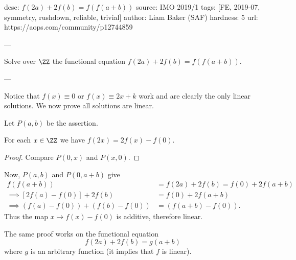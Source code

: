 desc: $f(2a) + 2f(b) = f(f(a+b))$
source: IMO 2019/1
tags: [FE, 2019-07, symmetry, rushdown, reliable, trivial]
author: Liam Baker (SAF)
hardness: 5
url: https://aops.com/community/p12744859

---

Solve over $\ZZ$ the functional equation
$f(2a) + 2f(b) = f(f(a+b))$.

---

Notice that $f(x) \equiv 0$ or $f(x) \equiv 2x+k$ work
and are clearly the only linear solutions.
We now prove all solutions are linear.

Let $P(a,b)$ be the assertion.
\begin{claim*}
  For each $x \in \ZZ$ we have $f(2x) = 2f(x) - f(0)$.
\end{claim*}
\begin{proof}
  Compare $P(0,x)$ and $P(x,0)$.
\end{proof}
Now, $P(a,b)$ and $P(0,a+b)$ give
\begin{align*}
  f(f(a+b)) &= f(2a) + 2f(b) = f(0) + 2f(a+b) \\
  \implies [2f(a) - f(0)] + 2f(b) &= f(0) + 2f(a+b) \\
  \implies \left( f(a)-f(0) \right) + \left( f(b)-f(0) \right)
  &= \left( f(a+b)-f(0) \right).
\end{align*}
Thus the map $x \mapsto f(x) - f(0)$ is additive,
therefore linear.

\begin{remark*}
  The same proof works on the functional equation
  \[ f(2a) + 2f(b) = g(a+b) \]
  where $g$ is an arbitrary function (it implies that $f$ is linear).
\end{remark*}
